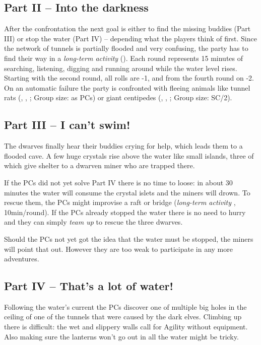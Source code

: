 {		\subsection{Part II -- Into the darkness}

		After the confrontation the next goal is either to find the missing buddies (Part III) or stop the water (Part IV) -- depending what the players think of first. Since the network of tunnels is partially flooded and very confusing, the party has to find their way in a \emph{long-term activity} (). Each round represents 15 minutes of searching, listening, digging and running around while the water level rises. Starting with the second round, all rolls are -1, and from the fourth round on -2. On an automatic failure the party is confronted with fleeing animals like tunnel rats (, , ; Group size: as PCs) or giant centipedes (, , ; Group size: SC/2).

		\subsection{Part III -- I can't swim!}

		The dwarves finally hear their buddies crying for help, which leads them to a flooded cave. A few huge crystals rise above the water like small islands, three of which give shelter to a dwarven miner who are trapped there.

		If the PCs did not yet solve Part IV there is no time to loose: in about 30 minutes the water will consume the crystal islets and the miners will drown. To rescue them, the PCs might improvise a raft or bridge (\emph{long-term activity} , 10min/round). If the PCs already stopped the water there is no need to hurry and they can simply \emph{team up}  to rescue the three dwarves.

		Should the PCs not yet got the idea that the water must be stopped, the miners will point that out. However they are too weak to participate in any more adventures.

		\subsection{Part IV -- That's a lot of water!}

		Following the water's current the PCs discover one of multiple big holes in the ceiling of one of the tunnels that were caused by the dark elves. Climbing up there is difficult: the wet and slippery walls call for Agility without equipment. Also making sure the lanterns won't go out in all the water might be tricky.

}
